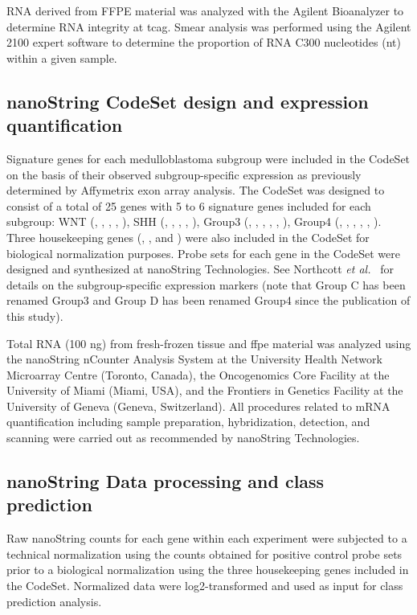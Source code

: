 RNA derived from FFPE material was analyzed with the Agilent Bioanalyzer to determine RNA integrity at \gls{tcag}. Smear analysis was performed using the Agilent 2100 expert software to determine the proportion of RNA C300 nucleotides (nt) within a given sample.

\subsection{nanoString CodeSet design and expression quantification}

Signature genes for each medulloblastoma subgroup were included in the CodeSet on the basis of their observed subgroup-specific expression as previously determined by Affymetrix exon array analysis.  The CodeSet was designed to consist of a total of 25 genes with 5 to 6 signature genes included for each subgroup: WNT (, , , , ), SHH (, , , , ), Group3 (, , , , , ), Group4 (, , , , , ).  Three housekeeping genes (, , and ) were also included in the CodeSet for biological normalization purposes.  Probe sets for each gene in the CodeSet were designed and synthesized at nanoString Technologies. See Northcott \emph{et al.}\  for details on the subgroup-specific expression markers (note that Group C has been renamed Group3 and Group D has been renamed Group4 since the publication of this study).

Total RNA (100 ng) from fresh-frozen tissue and \gls{ffpe} material was analyzed using the nanoString nCounter Analysis System at the University Health Network Microarray Centre (Toronto, Canada), the Oncogenomics Core Facility at the University of Miami (Miami, USA), and the Frontiers in Genetics Facility at the University of Geneva (Geneva, Switzerland).  All procedures related to mRNA quantification including sample preparation, hybridization, detection, and scanning were carried out as recommended by nanoString Technologies.

\subsection{nanoString Data processing and class prediction}

Raw nanoString counts for each gene within each experiment were subjected to a technical normalization using the counts obtained for positive control probe sets prior to a biological normalization using the three housekeeping genes included in the CodeSet.  Normalized data were log2-transformed and used as input for class prediction analysis.

